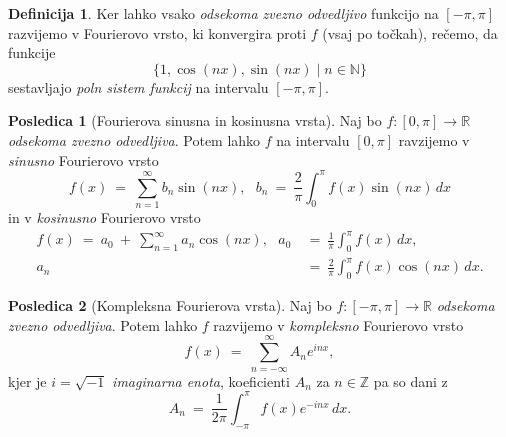 \documentclass[11pt]{article}
\theoremstyle{definition}
\newtheorem{definicija}{Definicija}[section]
\theoremstyle{definition}
\theoremstyle{definition}
\theoremstyle{theorem}
\newtheorem*{posledica}{Posledica}
\begin{document}
\begin{definicija}

Ker lahko vsako \textit{odsekoma zvezno odvedljivo} funkcijo na $[-\pi, \pi]$ razvijemo v Fourierovo vrsto, ki konvergira proti $f$ (vsaj po točkah), rečemo, da funkcije 
$$ \{ 1, \cos(nx), \sin(nx) \mid n \in \mathbb{N} \}$$
sestavljajo \textit{poln sistem funkcij} na intervalu $[-\pi, \pi]$.

\end{definicija}
\vspace{0.5cm}

\begin{posledica}[Fourierova sinusna in kosinusna vrsta]

Naj bo $f:[0, \pi] \rightarrow \mathbb{R}$ \textit{odsekoma zvezno odvedljiva}. Potem lahko $f$ na intervalu $[0, \pi]$ ravzijemo v \textit{sinusno} Fourierovo vrsto
$$f(x) ~=~ \sum_{n=1}^{\infty} b_n \sin(nx), ~~~b_n ~=~ \frac{2}{\pi} \int_{0}^{\pi} f(x) \sin(nx)\,dx$$
in v \textit{kosinusno} Fourierovo vrsto
\begin{align*}
f(x) ~=~ a_0 ~+~ \sum_{n=1}^{\infty} a_n \cos(nx), ~~~a_0 ~&=~ \frac{1}{\pi} \int_{0}^{\pi} f(x)\,dx, \\ a_n ~&=~ \frac{2}{\pi} \int_{0}^{\pi} f(x) \cos(nx)\,dx.
\end{align*}

\end{posledica}
\vspace{0.5cm}

\begin{posledica}[Kompleksna Fourierova vrsta]

Naj bo $f:[-\pi, \pi] \rightarrow \mathbb{R}$ \textit{\hbox{odsekoma} zvezno odvedljiva}. Potem lahko $f$ razvijemo v \textit{kompleksno} Fourierovo vrsto
$$f(x) ~=~ \sum_{n=-\infty}^{\infty} A_n e^{inx},$$
kjer je $i = \sqrt{-1}$ \textit{imaginarna enota}, koeficienti $A_n$ za $n \in \mathbb{Z}$ pa so dani z
$$A_n ~=~ \frac{1}{2\pi} \int_{-\pi}^{\pi} f(x) e^{-inx}\,dx.$$

\end{posledica}
\vspace{0.5cm}
\end{document}
